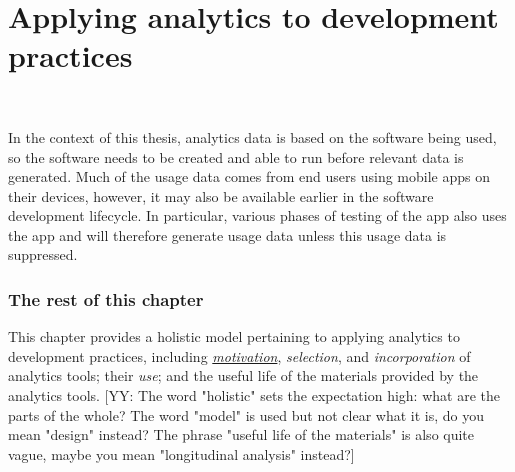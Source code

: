 \chapter{Applying analytics to development practices}~\label{chapter-applying-analytics-to-development-practices}

\def\yy#1{\color{blue}[YY: #1]\color{black}}

In the context of this thesis, analytics data is based on the software being used, so the software needs to be created and able to run before relevant data is generated. 
Much of the usage data comes from end users using mobile apps on their devices, however, it may also be available earlier in the software development lifecycle. In particular, various phases of testing of the app also uses the app and will therefore generate usage data unless this usage data is suppressed. 

\subsection{The rest of this chapter}
This chapter provides a holistic model pertaining to applying analytics to development practices, including \href{motivation-section}{\textit{motivation}}, \textit{selection}, and \textit{incorporation} of analytics tools; their \textit{use}; and the useful life of the materials provided by the analytics tools. 
\yy{The word "holistic" sets the expectation high: what are the parts of the whole? The word "model" is used but not clear what it is, do you mean "design" instead? The phrase "useful life of the materials" is also quite vague, maybe you mean "longitudinal analysis" instead?}


